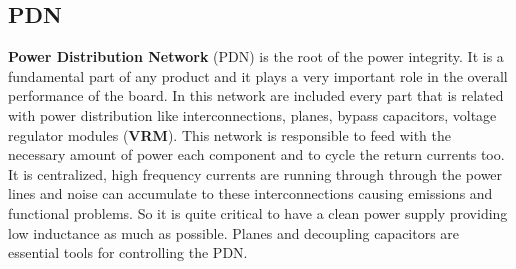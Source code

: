 \documentclass[final]{cubedoc}
\begin{document}
	
	\subsection{PDN}
	
	\textbf{Power Distribution Network} (PDN) is the root of the power integrity. It is a fundamental part of any product and it plays a very important role in the overall performance of the board. In this network are included every part that is related with power distribution like interconnections, planes, bypass capacitors, voltage regulator modules (\textbf{VRM}). This network is responsible to feed with the necessary amount of power each component and to cycle the return currents too. It is centralized, high frequency currents are running through through the power lines and noise can accumulate to these interconnections causing emissions and functional problems. So it is quite critical to have a clean power supply providing low inductance as much as possible. Planes and decoupling capacitors are essential tools for controlling the PDN.
	
\end{document}

